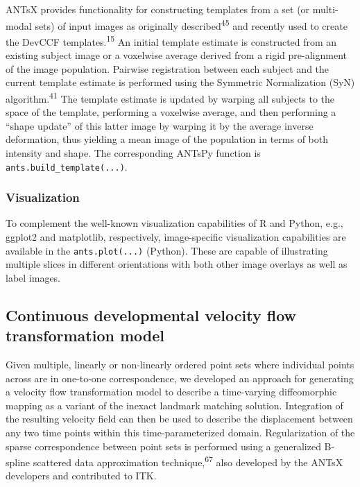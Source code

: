 \documentclass[
  12pt,
]{article}
\begin{document}
ANTsX provides functionality for constructing templates from a set (or
multi-modal sets) of input images as originally
described\textsuperscript{45} and recently used to create the DevCCF
templates.\textsuperscript{15} An initial template estimate is
constructed from an existing subject image or a voxelwise average
derived from a rigid pre-alignment of the image population. Pairwise
registration between each subject and the current template estimate is
performed using the Symmetric Normalization (SyN)
algorithm.\textsuperscript{41} The template estimate is updated by
warping all subjects to the space of the template, performing a
voxelwise average, and then performing a ``shape update'' of this latter
image by warping it by the average inverse deformation, thus yielding a
mean image of the population in terms of both intensity and shape. The
corresponding ANTsPy function is \texttt{ants.build\_template(...)}.

\hypertarget{visualization}{%
\subsubsection{Visualization}\label{visualization}}

To complement the well-known visualization capabilities of R and Python,
e.g., ggplot2 and matplotlib, respectively, image-specific visualization
capabilities are available in the \texttt{ants.plot(...)} (Python).
These are capable of illustrating multiple slices in different
orientations with both other image overlays as well as label images.

\hypertarget{continuous-developmental-velocity-flow-transformation-model}{%
\subsection{Continuous developmental velocity flow transformation
model}\label{continuous-developmental-velocity-flow-transformation-model}}

Given multiple, linearly or non-linearly ordered point sets where
individual points across are in one-to-one correspondence, we developed
an approach for generating a velocity flow transformation model to
describe a time-varying diffeomorphic mapping as a variant of the
inexact landmark matching solution. Integration of the resulting
velocity field can then be used to describe the displacement between any
two time points within this time-parameterized domain. Regularization of
the sparse correspondence between point sets is performed using a
generalized B-spline scattered data approximation
technique,\textsuperscript{67} also developed by the ANTsX developers
and contributed to ITK.
\end{document}
